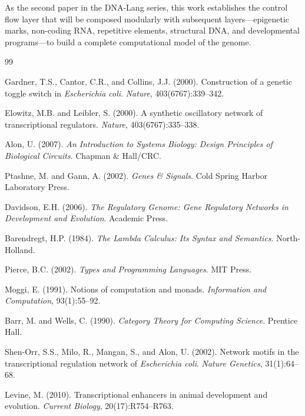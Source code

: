 \documentclass[12pt,a4paper]{article}
\begin{document}
As the second paper in the DNA-Lang series, this work establishes the control flow layer that will be composed modularly with subsequent layers---epigenetic marks, non-coding RNA, repetitive elements, structural DNA, and developmental programs---to build a complete computational model of the genome.



\begin{thebibliography}{99}

Gardner, T.S., Cantor, C.R., and Collins, J.J. (2000).
Construction of a genetic toggle switch in \textit{Escherichia coli}.
\textit{Nature}, 403(6767):339--342.

Elowitz, M.B. and Leibler, S. (2000).
A synthetic oscillatory network of transcriptional regulators.
\textit{Nature}, 403(6767):335--338.

Alon, U. (2007).
\textit{An Introduction to Systems Biology: Design Principles of Biological Circuits}.
Chapman \& Hall/CRC.

Ptashne, M. and Gann, A. (2002).
\textit{Genes \& Signals}.
Cold Spring Harbor Laboratory Press.

Davidson, E.H. (2006).
\textit{The Regulatory Genome: Gene Regulatory Networks in Development and Evolution}.
Academic Press.

Barendregt, H.P. (1984).
\textit{The Lambda Calculus: Its Syntax and Semantics}.
North-Holland.

Pierce, B.C. (2002).
\textit{Types and Programming Languages}.
MIT Press.

Moggi, E. (1991).
Notions of computation and monads.
\textit{Information and Computation}, 93(1):55--92.

Barr, M. and Wells, C. (1990).
\textit{Category Theory for Computing Science}.
Prentice Hall.

Shen-Orr, S.S., Milo, R., Mangan, S., and Alon, U. (2002).
Network motifs in the transcriptional regulation network of \textit{Escherichia coli}.
\textit{Nature Genetics}, 31(1):64--68.

Levine, M. (2010).
Transcriptional enhancers in animal development and evolution.
\textit{Current Biology}, 20(17):R754--R763.


\end{thebibliography}
\end{document}
